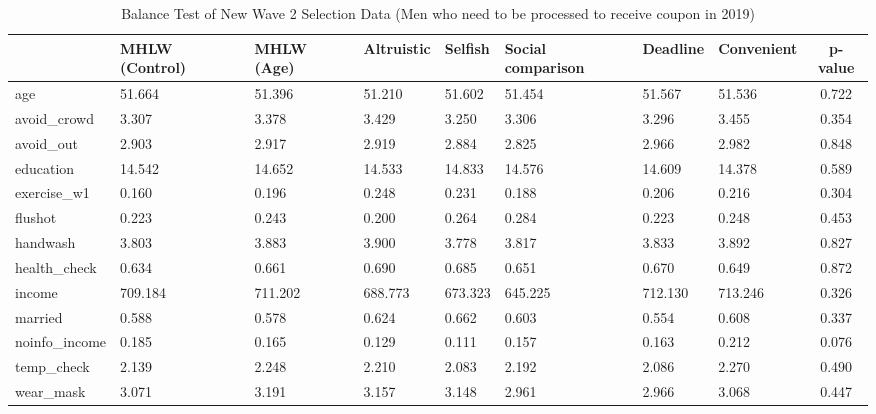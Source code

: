 \begin{table}[!h]

\caption{Balance Test of New Wave 2 Selection Data (Men who need to be processed to receive coupon in 2019) \label{tab:act2-coupon0-balance}}
\centering
\begin{tabular}[t]{l>{\centering\arraybackslash}p{3em}>{\centering\arraybackslash}p{3em}>{\centering\arraybackslash}p{3em}>{\centering\arraybackslash}p{3em}>{\centering\arraybackslash}p{3em}>{\centering\arraybackslash}p{3em}>{\centering\arraybackslash}p{3em}c}
\toprule
  & MHLW (Control) & MHLW (Age) & Altruistic & Selfish & Social comparison & Deadline & Convenient & p-value\\
\midrule
age & \num{51.664} & \num{51.396} & \num{51.210} & \num{51.602} & \num{51.454} & \num{51.567} & \num{51.536} & \num{0.722}\\
avoid\_crowd & \num{3.307} & \num{3.378} & \num{3.429} & \num{3.250} & \num{3.306} & \num{3.296} & \num{3.455} & \num{0.354}\\
avoid\_out & \num{2.903} & \num{2.917} & \num{2.919} & \num{2.884} & \num{2.825} & \num{2.966} & \num{2.982} & \num{0.848}\\
education & \num{14.542} & \num{14.652} & \num{14.533} & \num{14.833} & \num{14.576} & \num{14.609} & \num{14.378} & \num{0.589}\\
exercise\_w1 & \num{0.160} & \num{0.196} & \num{0.248} & \num{0.231} & \num{0.188} & \num{0.206} & \num{0.216} & \num{0.304}\\
flushot & \num{0.223} & \num{0.243} & \num{0.200} & \num{0.264} & \num{0.284} & \num{0.223} & \num{0.248} & \num{0.453}\\
handwash & \num{3.803} & \num{3.883} & \num{3.900} & \num{3.778} & \num{3.817} & \num{3.833} & \num{3.892} & \num{0.827}\\
health\_check & \num{0.634} & \num{0.661} & \num{0.690} & \num{0.685} & \num{0.651} & \num{0.670} & \num{0.649} & \num{0.872}\\
income & \num{709.184} & \num{711.202} & \num{688.773} & \num{673.323} & \num{645.225} & \num{712.130} & \num{713.246} & \num{0.326}\\
married & \num{0.588} & \num{0.578} & \num{0.624} & \num{0.662} & \num{0.603} & \num{0.554} & \num{0.608} & \num{0.337}\\
noinfo\_income & \num{0.185} & \num{0.165} & \num{0.129} & \num{0.111} & \num{0.157} & \num{0.163} & \num{0.212} & \num{0.076}\\
temp\_check & \num{2.139} & \num{2.248} & \num{2.210} & \num{2.083} & \num{2.192} & \num{2.086} & \num{2.270} & \num{0.490}\\
wear\_mask & \num{3.071} & \num{3.191} & \num{3.157} & \num{3.148} & \num{2.961} & \num{2.966} & \num{3.068} & \num{0.447}\\
\bottomrule
\end{tabular}
\end{table}

